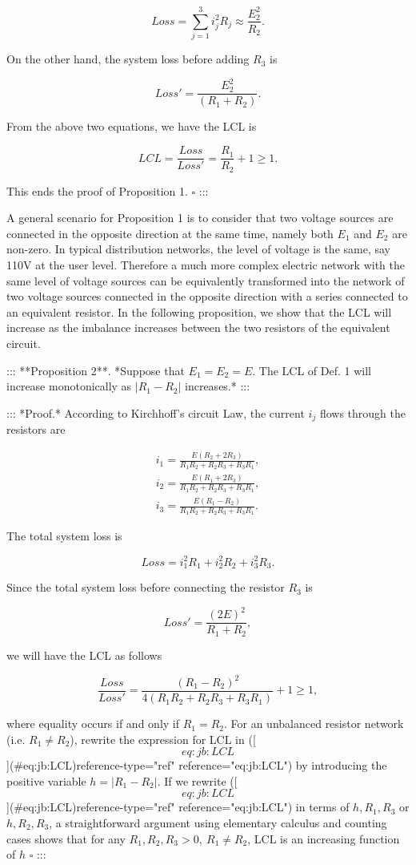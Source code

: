 $$Loss = \sum_{j=1}^{3} i_j^2R_j \approx \frac{E_2^2}{R_2}.$$

On the other hand, the system loss before adding $R_3$ is

$$Loss' = \frac{E_2^2}{(R_1+R_2)}.$$

From the above two equations, we have the LCL is

$$LCL = \frac{Loss}{Loss'} = \frac{R_1}{R_2} + 1 \geq 1.$$

This ends the proof of Proposition 1. $\square$ :::

A general scenario for Proposition 1 is to consider that two voltage sources are connected in the opposite direction at the same time, namely both $E_1$ and $E_2$ are non-zero. In typical distribution networks, the level of voltage is the same, say 110V at the user level. Therefore a much more complex electric network with the same level of voltage sources can be equivalently transformed into the network of two voltage sources connected in the opposite direction with a series connected to an equivalent resistor. In the following proposition, we show that the LCL will increase as the imbalance increases between the two resistors of the equivalent circuit.

::: **Proposition 2**. *Suppose that $E_1 = E_2 = E$. The LCL of Def. 1 will increase monotonically as $|R_1-R_2|$ increases.* :::

::: *Proof.* According to Kirchhoff's circuit Law, the current $i_j$ flows through the resistors are

$$\begin{aligned} i_1 = \frac{E (R_2+2R_3)}{R_1R_2+R_2R_3+R_3R_1},\nonumber\\ i_2 = \frac{E (R_1+2R_3)}{R_1R_2+R_2R_3+R_3R_1},\nonumber\\ i_3 = \frac{E (R_1-R_2)}{R_1R_2+R_2R_3+R_3R_1}.\nonumber \end{aligned}$$

The total system loss is

$$Loss = i_1^2R_1 +  i_2^2R_2+ i_3^2R_3.$$

Since the total system loss before connecting the resistor $R_3$ is

$$Loss' = \frac{(2E)^2}{R_1+R_2},$$

we will have the LCL as follows

$$\frac{Loss}{Loss'} = \frac{(R_1-R_2)^2}{4(R_1R_2+R_2R_3+R_3R_1)}+1\geq 1, \label{eq:jb:LCL}$$

where equality occurs if and only if $R_1=R_2$. For an unbalanced resistor network (i.e. $R_1\ne R_2$), rewrite the expression for LCL in ([\[eq:jb:LCL\]](#eq:jb:LCL){reference-type="ref" reference="eq:jb:LCL"}) by introducing the positive variable $h=|R_1-R_2|$. If we rewrite ([\[eq:jb:LCL\]](#eq:jb:LCL){reference-type="ref" reference="eq:jb:LCL"}) in terms of $h,R_1,R_3$ or $h,R_2,R_3$, a straightforward argument using elementary calculus and counting cases shows that for any $R_1,R_2,R_3>0,\ R_1\ne R_2$, LCL is an increasing function of $h$ $\square$ :::

